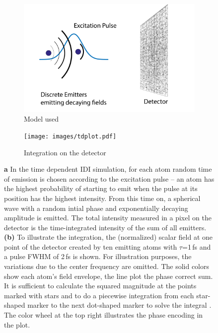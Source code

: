 \begin{figure}
	\centering
	\begin{subfigure}[b]{0.4\textwidth}
		\includegraphics[width=\linewidth]{images/simtd.pdf}
		\caption{Model used}
		\label{fig:simtd}
	\end{subfigure}
	\begin{subfigure}[b]{0.5\textwidth}
		\texttt{[image: images/tdplot.pdf]}
		\caption{Integration on the detector}
		\label{fig:tdplot}
	\end{subfigure}
	
	\caption[Model used in time dependent IDI simulation]{\textbf{a} In the time dependent IDI simulation, for each atom random time of emission is chosen according to the excitation pulse -- an atom has the highest probability of starting to emit when the pulse at its position has the highest intensity. From this time on, a spherical wave with a random intial phase and exponentially decaying amplitude is emitted. The total intensity measured in a pixel on the detector is the time-integrated intensity of the sum of all emitters.
		\textbf{(b)} To illustrate the integration, the (normalized) scalar field at one point of the detector created by ten emitting atoms with $\tau$=1\,fs and a pulse FWHM of 2\,fs is shown. For illustration purposes, the variations due to the center frequency are omitted. The solid colors show each atom's field envelope, the line plot the phase correct sum. It is sufficient to calculate the squared magnitude at the points marked with stars and to do a piecewise integration from each star-shaped marker to the next dot-shaped marker to solve the integral . The color wheel at the top right illustrates the phase encoding in the plot.}
	
\end{figure}

